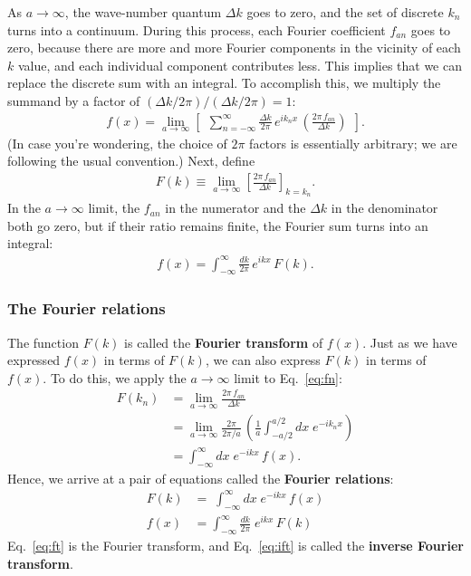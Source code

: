 \documentclass[10pt,a4paper]{article}
\begin{document}
As $a \rightarrow \infty$, the wave-number quantum $\Delta k$ goes to
zero, and the set of discrete $k_n$ turns into a continuum.  During
this process, each Fourier coefficient $f_{an}$ goes to zero, because
there are more and more Fourier components in the vicinity of each $k$
value, and each individual component contributes less.  This implies
that we can replace the discrete sum with an integral. To accomplish
this, we multiply the summand by a factor of $(\Delta k/2\pi) /
(\Delta k/2\pi) = 1$:
\begin{align}
  f(x) = \lim_{a\rightarrow \infty} \left[\;\,\sum_{n=-\infty}^\infty \frac{\Delta k}{2\pi} \, e^{i k_n x}\, \left(\frac{2\pi \,f_{an}}{\Delta k} \right)\;\,\right].
\end{align}
(In case you're wondering, the choice of $2\pi$ factors is essentially
arbitrary; we are following the usual convention.) Next, define
\begin{align}
  F(k) \equiv \lim_{a \rightarrow \infty} \left[\frac{2\pi\, f_{an}}{\Delta k}\right]_{k = k_n}.
\end{align}
In the $a \rightarrow \infty$ limit, the $f_{an}$ in the numerator and
the $\Delta k$ in the denominator both go zero, but if their ratio
remains finite, the Fourier sum turns into an integral:
\begin{align}
  f(x) = \int_{-\infty}^{\infty} \frac{dk}{2\pi} \, e^{i k x}\, F(k).
\end{align}

\subsubsection{The Fourier relations}
\label{the-fourier-relations}

The function $F(k)$ is called the \textbf{Fourier transform} of
$f(x)$.  Just as we have expressed $f(x)$ in terms of $F(k)$, we can
also express $F(k)$ in terms of $f(x)$.  To do this, we apply the $a
\rightarrow \infty$ limit to Eq.~\eqref{eq:fn}:
\begin{align}
  F(k_n) &= \lim_{a\rightarrow \infty} \frac{2 \pi\, f_{an}}{\Delta k} \\
  &= \lim_{a\rightarrow \infty} \frac{2 \pi}{2\pi/a}\, \left(\frac{1}{a} \int_{-a/2}^{a/2} dx\; e^{-i k_n x}\right) \\
  &= \int_{-\infty}^\infty dx\; e^{-i kx}\, f(x).
\end{align}
Hence, we arrive at a pair of equations called the \textbf{Fourier
  relations}:
\begin{align}
  F(k) &= \;\int_{-\infty}^\infty dx\; e^{-ikx}\, f(x) \label{eq:ft}\\
  f(x) &= \int_{-\infty}^\infty \frac{dk}{2\pi}\; e^{ikx}\, F(k) \label{eq:ift}
\end{align}
Eq.~\eqref{eq:ft} is the Fourier transform, and Eq.~\eqref{eq:ift} is
called the \textbf{inverse Fourier transform}.
\end{document}
